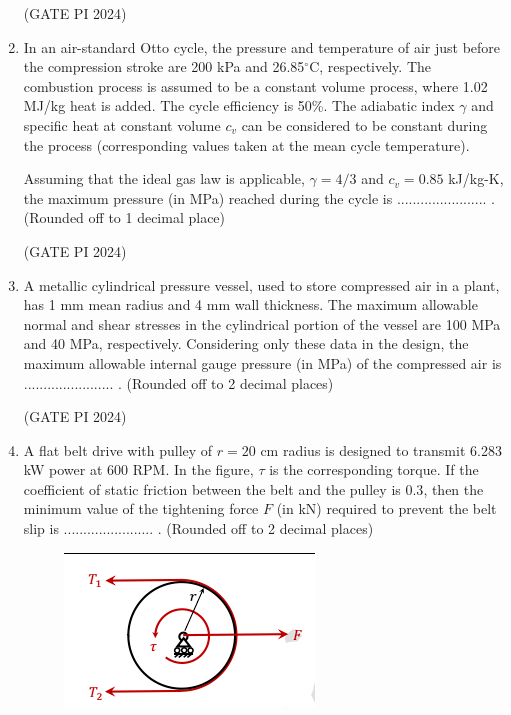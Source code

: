 \documentclass[journal,12pt,onecolumn]{IEEEtran}
\theoremstyle{remark}
\begin{document}
\begin{enumerate}
\hfill (GATE PI 2024)

\item In an air-standard Otto cycle, the pressure and temperature of air just before the compression stroke are 200 kPa and 26.85$^\circ$C, respectively. The combustion process is assumed to be a constant volume process, where 1.02 MJ/kg heat is added. The cycle efficiency is 50\%. The adiabatic index $\gamma$ and specific heat at constant volume $c_v$ can be considered to be constant during the process (corresponding values taken at the mean cycle temperature).

Assuming that the ideal gas law is applicable, $\gamma = 4/3$ and $c_v = 0.85$ kJ/kg-K, the maximum pressure (in MPa) reached during the cycle is ....................... . (Rounded off to 1 decimal place)

\hfill (GATE PI 2024)

\item A metallic cylindrical pressure vessel, used to store compressed air in a plant, has 1 mm mean radius and 4 mm wall thickness. The maximum allowable normal and shear stresses in the cylindrical portion of the vessel are 100 MPa and 40 MPa, respectively. Considering only these data in the design, the maximum allowable internal gauge pressure (in MPa) of the compressed air is ....................... . (Rounded off to 2 decimal places)

\hfill (GATE PI 2024)

\item A flat belt drive with pulley of $r = 20$ cm radius is designed to transmit 6.283 kW power at 600 RPM. In the figure, $\tau$ is the corresponding torque. If the coefficient of static friction between the belt and the pulley is $0.3$, then the minimum value of the tightening force $F$ (in kN) required to prevent the belt slip is ....................... . (Rounded off to 2 decimal places)

\begin{figure}[H]
\centering
\includegraphics[width=0.5\columnwidth]{fig10.png}
\caption{}
\end{figure}


\end{enumerate}
\end{document}
